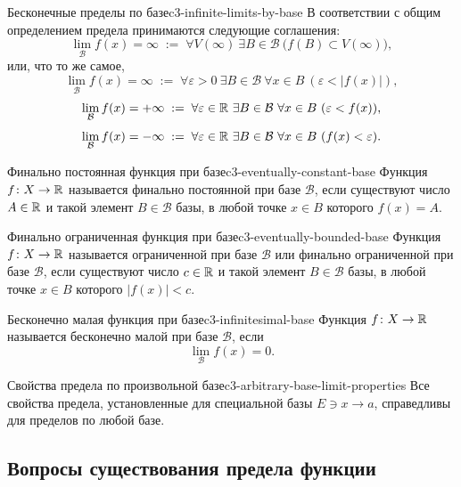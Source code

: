 \begin{definition}{Бесконечные пределы по базе}{c3-infinite-limits-by-base}
  В соответствии с общим определением предела принимаются следующие
  соглашения:
  \[
    \lim_{\mathcal B}f(x)=\infty
    \;:=\;
    \forall V(\infty)\ \exists B\in\mathcal B\
    \bigl(f(B)\subset V(\infty)\bigr),
  \]
  или, что то же самое,
  \[
    \lim_{\mathcal B}f(x)=\infty
    \;:=\;
    \forall\varepsilon>0\ \exists B\in\mathcal B\ \forall x\in B\
    (\varepsilon<|f(x)|),
  \]
  \[
    \lim_{\mathcal B}f(x)=+\infty
    \;:=\;
    \forall\varepsilon\in\mathbb{R}\ \exists B\in\mathcal B\ \forall x\in B\
    (\varepsilon<f(x)),
  \]
  \[
    \lim_{\mathcal B}f(x)=-\infty
    \;:=\;
    \forall\varepsilon\in\mathbb{R}\ \exists B\in\mathcal B\ \forall x\in B\
    (f(x)<\varepsilon).
  \]
\end{definition}

\begin{definition}{Финально постоянная функция при базе}{c3-eventually-constant-base}
  Функция $f\colon X\to\mathbb{R}$ называется финально постоянной при базе
  $\mathcal B$, если существуют число $A\in\mathbb{R}$ и такой элемент
  $B\in\mathcal B$ базы, в любой точке $x\in B$ которого $f(x)=A$.
\end{definition}

\begin{definition}{Финально ограниченная функция при базе}{c3-eventually-bounded-base}
  Функция $f\colon X\to\mathbb{R}$ называется ограниченной при базе $\mathcal B$
  или финально ограниченной при базе $\mathcal B$, если существуют число
  $c\in\mathbb{R}$ и такой элемент $B\in\mathcal B$ базы, в любой точке $x\in B$
  которого $|f(x)|<c$.
\end{definition}

\begin{definition}{Бесконечно малая функция при базе}{c3-infinitesimal-base}
  Функция $f\colon X\to\mathbb{R}$ называется бесконечно малой при базе
  $\mathcal B$, если
  \[
    \lim_{\mathcal B}f(x)=0.
  \]
\end{definition}

\begin{properties}{Свойства предела по произвольной базе}{c3-arbitrary-base-limit-properties}
  Все свойства предела, установленные для специальной базы
  $E\ni x\to a$, справедливы для пределов по любой базе.
\end{properties}

\clearpage
\subsection{Вопросы существования предела функции}

